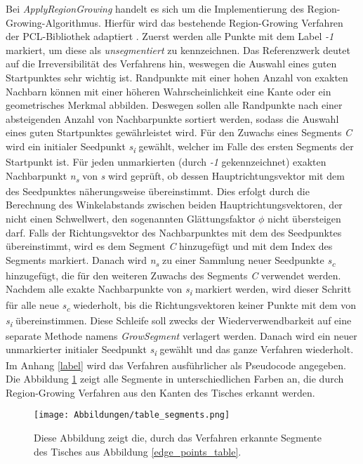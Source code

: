 Bei \textit{ApplyRegionGrowing} handelt es sich um die Implementierung des Region-Growing-Algorithmus. Hierfür wird das bestehende Region-Growing Verfahren der PCL-Bibliothek adaptiert \autocite{rusu_3d_2011}. Zuerst werden alle Punkte mit dem Label \textit{-1} markiert, um diese als \textit{unsegmentiert} zu kennzeichnen. Das Referenzwerk deutet auf die Irreversibilität des Verfahrens hin, weswegen die Auswahl eines guten Startpunktes sehr wichtig ist. Randpunkte mit einer hohen Anzahl von exakten Nachbarn können mit einer höheren Wahrscheinlichkeit eine Kante oder ein geometrisches Merkmal abbilden. Deswegen sollen alle Randpunkte nach einer absteigenden Anzahl von Nachbarpunkte sortiert werden, sodass die Auswahl eines guten Startpunktes gewährleistet wird. Für den Zuwachs eines Segments \textit{C} wird ein initialer Seedpunkt \textit{s\textsubscript{i}} gewählt, welcher im Falle des ersten Segments der Startpunkt ist. Für jeden unmarkierten (durch \textit{-1} gekennzeichnet) exakten Nachbarpunkt \textit{n\textsubscript{s}} von \textit{s} wird geprüft, ob dessen Hauptrichtungsvektor mit dem des Seedpunktes näherungsweise übereinstimmt. Dies erfolgt durch die Berechnung des Winkelabstands zwischen beiden Hauptrichtungsvektoren, der nicht einen Schwellwert, den sogenannten Glättungsfaktor $\phi$ nicht übersteigen darf. Falls der Richtungsvektor des Nachbarpunktes mit dem des Seedpunktes übereinstimmt, wird es dem Segment \textit{C} hinzugefügt und mit dem Index des Segments markiert. Danach wird \textit{n\textsubscript{s}} zu einer Sammlung neuer Seedpunkte \textit{s\textsubscript{c}} hinzugefügt, die für den weiteren Zuwachs des Segments \textit{C} verwendet werden. Nachdem alle exakte Nachbarpunkte von \textit{s\textsubscript{i}} markiert werden, wird dieser Schritt für alle neue \textit{s\textsubscript{c}} wiederholt, bis die Richtungsvektoren keiner Punkte mit dem von \textit{s\textsubscript{i}} übereinstimmen. Diese Schleife soll zwecks der Wiederverwendbarkeit auf eine separate Methode namens \textit{GrowSegment} verlagert werden. Danach wird ein neuer unmarkierter initialer Seedpunkt \textit{s\textsubscript{i}} gewählt und das ganze Verfahren wiederholt. Im Anhang \ref{label} wird das Verfahren ausführlicher als Pseudocode angegeben. Die Abbildung \ref{segments_table} zeigt alle Segmente in unterschiedlichen Farben an, die durch Region-Growing Verfahren aus den Kanten des Tisches erkannt werden.

\begin{figure}[h]
	\texttt{[image: Abbildungen/table\_segments.png]}
	\centering
	\caption{Diese Abbildung zeigt die, durch das Verfahren erkannte  Segmente des Tisches aus Abbildung \ref{edge_points_table}.}
	\label{segments_table}
\end{figure}

